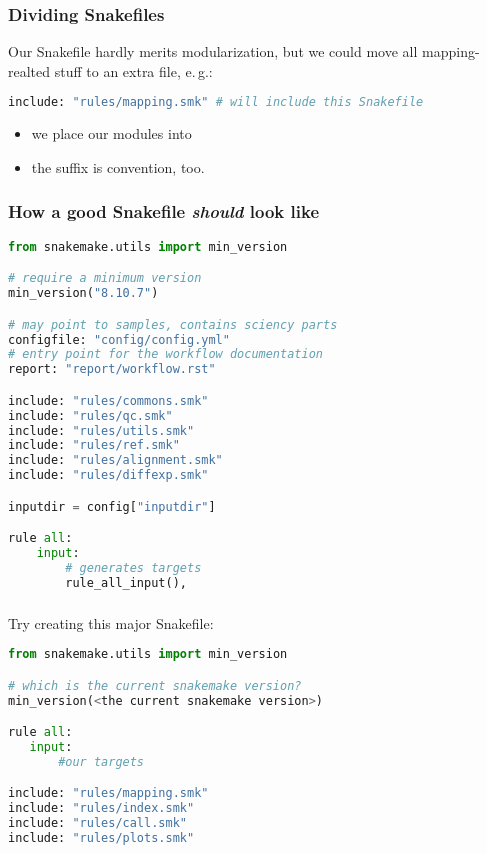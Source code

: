\begin{frame}[fragile]
	\frametitle{Dividing Snakefiles}
	Our Snakefile hardly merits modularization, but we could move all mapping-realted stuff to an extra file, e.\,g.:
	\begin{lstlisting}[language=Python,style=Python]
include: "rules/mapping.smk" # will include this Snakefile
	\end{lstlisting}
    \pause
    \begin{docs}
    	\begin{itemize}[<+->]
    		\item we  place our modules into 
    		\item the suffix  is convention, too.
    	\end{itemize}
    \end{docs}
\end{frame}

\begin{frame}[fragile]
	\frametitle{How a good Snakefile \emph{should} look like}
	\begin{lstlisting}[language=Python,style=Python]
from snakemake.utils import min_version

# require a minimum version
min_version("8.10.7")

# may point to samples, contains sciency parts
configfile: "config/config.yml"
# entry point for the workflow documentation
report: "report/workflow.rst"

include: "rules/commons.smk"
include: "rules/qc.smk"
include: "rules/utils.smk"
include: "rules/ref.smk"
include: "rules/alignment.smk"
include: "rules/diffexp.smk"

inputdir = config["inputdir"]

rule all:
    input:
        # generates targets
        rule_all_input(),
	\end{lstlisting}
\end{frame}

\begin{frame}[fragile]
	\frametitle{}
	Try creating this major Snakefile:
	\begin{lstlisting}[language=Python,style=Python]
from snakemake.utils import min_version

# which is the current snakemake version?
min_version(<the current snakemake version>)

rule all:
   input:
       #our targets

include: "rules/mapping.smk"
include: "rules/index.smk"
include: "rules/call.smk"
include: "rules/plots.smk"
	\end{lstlisting}
\end{frame}

